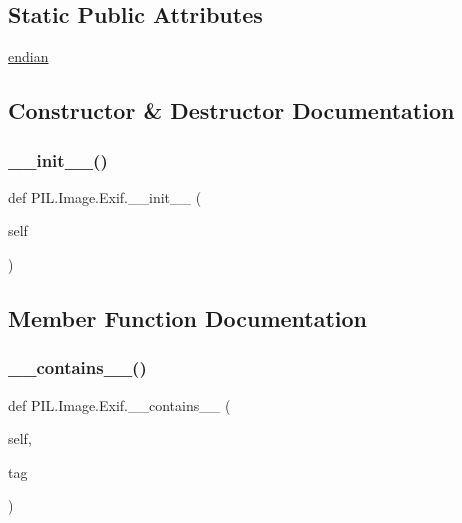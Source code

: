 \subsection*{Static Public Attributes}
\begin{DoxyCompactItemize}
\item 
\hyperlink{classPIL_1_1Image_1_1Exif_a491a5ce7c722bb7683f1bbdf4fa96296}{endian}
\end{DoxyCompactItemize}


\subsection{Constructor \& Destructor Documentation}
\mbox{\label{classPIL_1_1Image_1_1Exif_a15d7ea75e1a2d1101c4a26ae3632608e}} 
\subsubsection{\texorpdfstring{\+\_\+\+\_\+init\+\_\+\+\_\+()}{\_\_init\_\_()}}
{\footnotesize\ttfamily def P\+I\+L.\+Image.\+Exif.\+\_\+\+\_\+init\+\_\+\+\_\+ (\begin{DoxyParamCaption}\item[{}]{self }\end{DoxyParamCaption})}



\subsection{Member Function Documentation}
\mbox{\label{classPIL_1_1Image_1_1Exif_a0c9c2892531ce88f0ca0161ed96c5720}} 
\subsubsection{\texorpdfstring{\+\_\+\+\_\+contains\+\_\+\+\_\+()}{\_\_contains\_\_()}}
{\footnotesize\ttfamily def P\+I\+L.\+Image.\+Exif.\+\_\+\+\_\+contains\+\_\+\+\_\+ (\begin{DoxyParamCaption}\item[{}]{self,  }\item[{}]{tag }\end{DoxyParamCaption})}

